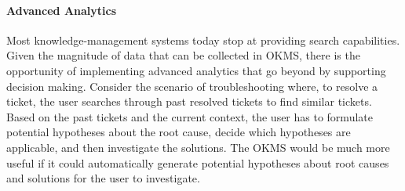 
\vskip -5pt
\paragraph*{Advanced Analytics}
Most knowledge-management systems today stop at providing search
capabilities. Given the magnitude of data that can be collected in OKMS, there
is the opportunity of implementing advanced analytics that go beyond by
supporting decision making. Consider the scenario of troubleshooting where, to
resolve a ticket, the user searches through past resolved tickets to find
similar tickets.  Based on the past tickets and the current context, the user
has to formulate potential hypotheses about the root cause, decide which
hypotheses are applicable, and then investigate the solutions. The OKMS would be
much more useful if it could automatically generate potential hypotheses about
root causes and solutions for the user to investigate.

